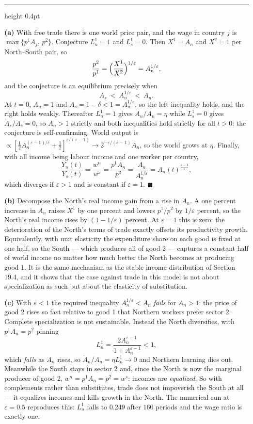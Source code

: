 \documentclass[11pt,letterpaper,reqno]{amsart}
\makeatletter
\newcommand{\dt}[1]{\dot{#1}}
\newcommand{\as@head}[3]{%
  \par\addvspace{1.6ex}\penalty-200\relax
  \phantomsection
  \addcontentsline{toc}{subsection}{#1 #2\texorpdfstring{\ifx\relax#3\relax\else\quad #3\fi}{}}%
  {\color{RuleGrey}\hrule height 0.4pt}%
  \nobreak\vspace{0.8ex}\nobreak
  \noindent{\bfseries #1 #2}%
  \ifx\relax#3\relax\else\quad{\bfseries\itshape #3}\fi
  \par\nobreak\vspace{0.4ex}\nobreak
  \as@beginstatement
}
\newcommand{\as@beginstatement}{\begingroup\itshape\ignorespaces}
\newenvironment{aex}[2]{\as@head{Exercise}{#1}{#2}}{\par\addvspace{1.2ex}}
\renewcommand{\as@beginstatement}{\ignorespaces}
\makeatother
\begin{document}
\begin{aex}{19.36}{}
\textbf{(a)}  With free trade there is one world price pair, and the wage in country $j$ is
$\max\{p^1A_j,\,p^2\}$.  Conjecture $L^{1}_n=1$ and $L^1_s=0$.  Then $X^1=A_n$ and $X^2=1$ per
North--South pair, so
\[
\frac{p^2}{p^1}=\Bigl(\frac{X^1}{X^2}\Bigr)^{1/\varepsilon}=A_n^{1/\varepsilon} ,
\]
and the conjecture is an equilibrium precisely when
\[
A_s\ <\ A_n^{1/\varepsilon}\ <\ A_n .
\]
At $t=0$, $A_n=1$ and $A_s=1-\delta<1=A_n^{1/\varepsilon}$, so the left inequality holds, and the
right holds weakly.  Thereafter $L^1_n=1$ gives $\dt A_n/A_n=\eta$ while $L^1_s=0$ gives
$\dt A_s/A_s=0$, so $A_n>1$ strictly and both inequalities hold strictly for all $t>0$: the
conjecture is self-confirming.  World output is
$\propto[\tfrac12A_n^{(\varepsilon-1)/\varepsilon}+\tfrac12]^{\varepsilon/(\varepsilon-1)}
\to2^{-\varepsilon/(\varepsilon-1)}A_n$, so the world grows at $\eta$.  Finally, with all income
being labour income and one worker per country,
\[
\boxed{\ \frac{Y_n(t)}{Y_s(t)}=\frac{w^n}{w^s}=\frac{p^1A_n}{p^2}
=\frac{A_n}{A_n^{1/\varepsilon}}=A_n(t)^{\frac{\varepsilon-1}{\varepsilon}} , \ }
\]
which diverges if $\varepsilon>1$ and is constant if $\varepsilon=1$. $\blacksquare$

\textbf{(b)}  Decompose the North's real income gain from a rise in $A_n$.  A one percent increase
in $A_n$ raises $X^1$ by one percent and lowers $p^1/p^2$ by $1/\varepsilon$ percent, so the
North's real income rises by $(1-1/\varepsilon)$ percent.  At $\varepsilon=1$ this is zero: the
deterioration of the North's terms of trade exactly offsets its productivity growth.  Equivalently,
with unit elasticity the expenditure share on each good is fixed at one half, so the South ---
which produces all of good 2 --- captures a constant half of world income no matter how much
better the North becomes at producing good 1.  It is the same mechanism as the stable income
distribution of Section 19.4, and it shows that the case against trade in this model is not about
specialization as such but about the elasticity of substitution.

\textbf{(c)}  With $\varepsilon<1$ the required inequality $A_n^{1/\varepsilon}<A_n$ \emph{fails}
for $A_n>1$: the price of good 2 rises so fast relative to good 1 that Northern workers prefer
sector 2.  Complete specialization is not sustainable.  Instead the North diversifies, with
$p^1A_n=p^2$ pinning
\[
L^1_n=\frac{2A_n^{\varepsilon-1}}{1+A_n^{\varepsilon-1}}<1 ,
\]
which \emph{falls} as $A_n$ rises, so $\dt A_n/A_n=\eta L^1_n\to0$ and Northern learning dies out.
Meanwhile the South stays in sector 2 and, since the North is now the marginal producer of good 2,
$w^n=p^1A_n=p^2=w^s$: incomes are \emph{equalized}.  So with complements rather than substitutes,
trade does not impoverish the South at all --- it equalizes incomes and kills growth in the North.
The numerical run at $\varepsilon=0.5$ reproduces this: $L^1_n$ falls to $0.249$ after $160$
periods and the wage ratio is exactly one.


\end{aex}
\end{document}
